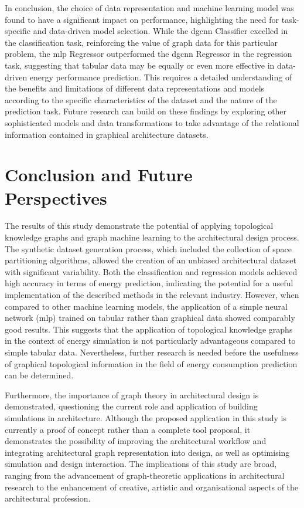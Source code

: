 \documentclass[a4paper, 12pt]{report}
\begin{document}
In conclusion, the choice of data representation and machine learning model was found to have a significant impact on performance, highlighting the need for task-specific and data-driven model selection. While the \acrshort{dgcnn} Classifier excelled in the classification task, reinforcing the value of graph data for this particular problem, the \acrshort{mlp} Regressor outperformed the \acrshort{dgcnn} Regressor in the regression task, suggesting that tabular data may be equally or even more effective in data-driven energy performance prediction. This requires a detailed understanding of the benefits and limitations of different data representations and models according to the specific characteristics of the dataset and the nature of the prediction task. Future research can build on these findings by exploring other sophisticated models and data transformations to take advantage of the relational information contained in graphical architecture datasets.

\chapter{Conclusion and Future Perspectives}\label{chap:conclusion-and-future-perspectives}

The results of this study demonstrate the potential of applying topological \glspl{knowledge graph} and graph machine learning to the architectural design process. The synthetic dataset generation process, which included the collection of space partitioning algorithms, allowed the creation of an unbiased architectural dataset with significant variability. Both the classification and regression models achieved high accuracy in terms of energy prediction, indicating the potential for a useful implementation of the described methods in the relevant industry. However, when compared to other machine learning models, the application of a simple neural network (\acrshort{mlp}) trained on tabular rather than graphical data showed comparably good results. This suggests that the application of topological \glspl{knowledge graph} in the context of energy simulation is not particularly advantageous compared to simple tabular data. Nevertheless, further research is needed before the usefulness of graphical topological information in the field of energy consumption prediction can be determined.

Furthermore, the importance of graph theory in architectural design is demonstrated, questioning the current role and application of building simulations in architecture. Although the proposed application in this study is currently a proof of concept rather than a complete tool proposal, it demonstrates the possibility of improving the architectural workflow and integrating architectural graph representation into design, as well as optimising simulation and design interaction. The implications of this study are broad, ranging from the advancement of graph-theoretic applications in architectural research to the enhancement of creative, artistic and organisational aspects of the architectural profession.
\end{document}
